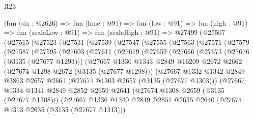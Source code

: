 \begin{lexlean}{R23}
\begin{coremodule}
    (fun (six : @2626) =>
    fun (lane : @91) =>
    fun (low : @91) =>
    fun (high : @91) =>
    fun (scaleLow : @91) =>
    fun (scaleHigh : @91) =>
    @27499
      (@27507
        (@27515
          (@27523
            (@27531
              (@27539
                (@27547
                  (@27555
                    (@27563
                      (@27571
                        (@27579
                          (@27587
                            (@27595
                              (@27603
                                (@27611
                                  (@27619
                                    (@27659
                                      (@27666
                                        (@27673
                                          (@27676 (@3135 (@27677 @1293)))
                                          (@27667
                                            @1330
                                            @1343
                                            @2849
                                            @16209
                                            @2672
                                            @2662
                                            (@27674 @1298 @2672 (@3135 (@27677 @1298)))
                                            (@27667
                                              @1332
                                              @1342
                                              @2849
                                              @3863
                                              @2657
                                              @2661
                                              (@27674 @1303 @2657 (@3135 (@27677 @1303)))
                                              (@27667
                                                @1334
                                                @1341
                                                @2849
                                                @2852
                                                @2659
                                                @2641
                                                (@27674 @1308 @2659 (@3135 (@27677 @1308)))
                                                (@27667
                                                  @1336
                                                  @1340
                                                  @2849
                                                  @2851
                                                  @2635
                                                  @2640
                                                  (@27674 @1313 @2635 (@3135 (@27677 @1313)))

\end{coremodule}
\end{lexlean}
